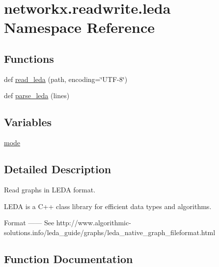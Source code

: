 \hypertarget{namespacenetworkx_1_1readwrite_1_1leda}{}\section{networkx.\+readwrite.\+leda Namespace Reference}
\label{namespacenetworkx_1_1readwrite_1_1leda}
\subsection*{Functions}
\begin{DoxyCompactItemize}
\item 
def \hyperlink{namespacenetworkx_1_1readwrite_1_1leda_ad5d909359692d23cb40dc859cdf76f2b}{read\+\_\+leda} (path, encoding=\char`\"{}U\+TF-\/8\char`\"{})
\item 
def \hyperlink{namespacenetworkx_1_1readwrite_1_1leda_ad6e90bae951d9d2a6c08eae3a222f027}{parse\+\_\+leda} (lines)
\end{DoxyCompactItemize}
\subsection*{Variables}
\begin{DoxyCompactItemize}
\item 
\hyperlink{namespacenetworkx_1_1readwrite_1_1leda_aef752773fe0772bf06fb2037ad6ff8bf}{mode}
\end{DoxyCompactItemize}


\subsection{Detailed Description}
\begin{DoxyVerb}Read graphs in LEDA format.

LEDA is a C++ class library for efficient data types and algorithms.

Format
------
See http://www.algorithmic-solutions.info/leda_guide/graphs/leda_native_graph_fileformat.html\end{DoxyVerb}
 

\subsection{Function Documentation}
\mbox{\label{namespacenetworkx_1_1readwrite_1_1leda_ad6e90bae951d9d2a6c08eae3a222f027}} 

